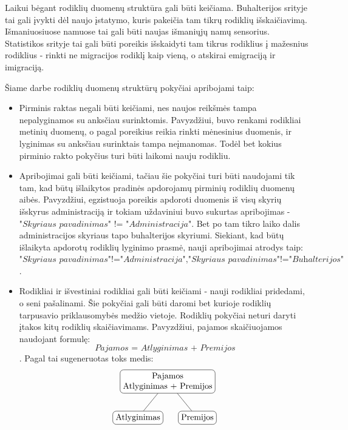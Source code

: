 \documentclass{VUMIFPSbakalaurinis}
\begin{document}
Laikui bėgant rodiklių duomenų struktūra gali būti keičiama. Buhalterijos srityje tai gali įvykti dėl naujo įstatymo, kuris pakeičia tam tikrų rodiklių išskaičiavimą. Išmaniuosiuose namuose tai gali būti naujas išmaniųjų namų sensorius. Statistikos srityje tai gali būti poreikis išskaidyti tam tikrus rodiklius į mažesnius rodiklius - rinkti ne migracijos rodiklį kaip vieną, o atskirai emigraciją ir imigraciją. \par
Šiame darbe rodiklių duomenų struktūrų pokyčiai apribojami taip:
\begin{itemize}
    \item Pirminis raktas negali būti keičiami, nes naujos reikšmės tampa nepalyginamos su anksčiau surinktomis. Pavyzdžiui, buvo renkami rodikliai metinių duomenų, o pagal poreikius reikia rinkti mėnesinius duomenis, ir lyginimas su anksčiau surinktais tampa neįmanomas. Todėl bet kokius pirminio rakto pokyčius turi būti laikomi nauju rodikliu. 
    \item Apribojimai gali būti keičiami, tačiau šie pokyčiai turi būti naudojami tik tam, kad būtų išlaikytos pradinės apdorojamų pirminių rodiklių duomenų aibės. Pavyzdžiui, egzistuoja poreikis apdoroti duomenis iš visų skyrių išskyrus administraciją ir tokiam uždaviniui buvo sukurtas apribojimas - \(\textit{"Skyriaus pavadinimas" != "Administracija"}\). Bet po tam tikro laiko dalis administracijos skyriaus tapo buhalterijos skyriumi. Siekiant, kad būtų išlaikyta apdorotų rodiklių lyginimo prasmė, nauji apribojimai atrodys taip: \(\textit{"Skyriaus pavadinimas"!="Administracija"}, \textit{"Skyriaus pavadinimas"!="Buhalterijos"}\).
    \item Rodikliai ir išvestiniai rodikliai gali būti keičiami - nauji rodikliai pridedami, o seni pašalinami. Šie pokyčiai gali būti daromi bet kurioje rodiklių tarpusavio priklausomybės medžio vietoje. Rodiklių pokyčiai neturi daryti įtakos kitų rodiklių skaičiavimams. Pavyzdžiui, pajamos skaičiuojamos naudojant formulę: \[\textit{Pajamos = Atlyginimas + Premijos}\]. Pagal tai sugeneruotas toks medis: 
    \[	
        \begin{tikzpicture}[sibling distance=7em,	
            every node/.style = {shape=rectangle, rounded corners,	
                                 draw, align=center,	
                                 top color=white, bottom color=white}]	
            \node {Pajamos\\Atlyginimas + Premijos}	
                    child { node {Atlyginimas} }	
                    child { node {Premijos} } ;	
        \end{tikzpicture} 	
\]
\end{itemize}
\end{document}
